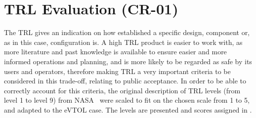 \section{TRL Evaluation (CR-01)}
\label{sec:trlevaluation}
The TRL gives an indication on how established a specific design, component or, as in this case, configuration is.
A high TRL product is easier to work with, as more literature and past knowledge is available to ensure easier and more informed operations and planning, and is more likely to be regarded as safe by its users and operators, therefore making TRL a very important criteria to be considered in this trade-off, relating to public acceptance.
In order to be able to correctly account for this criteria, the original description of TRL levels (from level 1 to level 9) from NASA~\cite{nasatrl} were scaled to fit on the chosen scale from 1 to 5, and adapted to the eVTOL case.
The levels are presented and scores assigned in .
